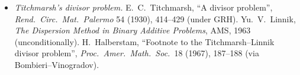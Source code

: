 \begin{itemize}
\item \emph{Titchmarsh's divisor problem.} E.~C.~Titchmarsh, ``A divisor problem'', \emph{Rend.\ Circ.\ Mat.\ Palermo} 54 (1930), 414--429 (under GRH). Yu.~V.~Linnik, \emph{The Dispersion Method in Binary Additive Problems}, AMS, 1963 (unconditionally). H.~Halberstam, ``Footnote to the Titchmarsh--Linnik divisor problem'', \emph{Proc.\ Amer.\ Math.\ Soc.}\ 18 (1967), 187--188 (via Bombieri--Vinogradov).
\end{itemize}
